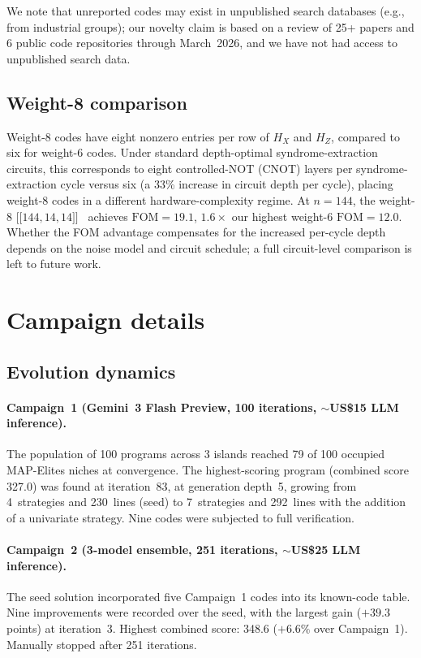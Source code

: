 \documentclass[aps,prxquantum,twocolumn,superscriptaddress,nofootinbib]{revtex4-2}
\newcommand{\dblbrk}[1]{\ensuremath{\lbrack\!\lbrack #1 \rbrack\!\rbrack}}
\newcommand{\code}[1]{\dblbrk{#1}}
\newcommand{\FOM}{\ensuremath{\mathrm{FOM}}}
\begin{document}
We note that unreported codes may exist in unpublished search databases (e.g., from industrial groups); our novelty claim is based on a review of 25+ papers and 6 public code repositories through March~2026, and we have not had access to unpublished search data.

\subsection{Weight-8 comparison}
\label{sm:weight8}

Weight-8 codes have eight nonzero entries per row of $H_X$ and $H_Z$, compared to six for weight-6 codes.
Under standard depth-optimal syndrome-extraction circuits, this corresponds to eight controlled-NOT (CNOT) layers per syndrome-extraction cycle versus six (a 33\% increase in circuit depth per cycle), placing weight-8 codes in a different hardware-complexity regime.
At $n = 144$, the weight-8 $\code{144,14,14}$~\cite{symons2025covering} achieves $\FOM = 19.1$, $1.6\times$ our highest weight-6 $\FOM = 12.0$.
Whether the FOM advantage compensates for the increased per-cycle depth depends on the noise model and circuit schedule; a full circuit-level comparison is left to future work.

\section{Campaign details}
\label{sm:campaigns}

\subsection{Evolution dynamics}

\paragraph{Campaign~1 (Gemini~3 Flash Preview, 100 iterations, ${\sim}$US\$15 LLM inference).}
The population of 100 programs across 3 islands reached 79 of 100 occupied MAP-Elites niches at convergence.
The highest-scoring program (combined score 327.0) was found at iteration~83, at generation depth~5, growing from 4~strategies and 230~lines (seed) to 7~strategies and 292~lines with the addition of a univariate strategy.
Nine codes were subjected to full verification.

\paragraph{Campaign~2 (3-model ensemble, 251 iterations, ${\sim}$US\$25 LLM inference).}
The seed solution incorporated five Campaign~1 codes into its known-code table.
Nine improvements were recorded over the seed, with the largest gain ($+39.3$ points) at iteration~3.
Highest combined score: 348.6 ($+6.6\%$ over Campaign~1).
Manually stopped after 251 iterations.
\end{document}
